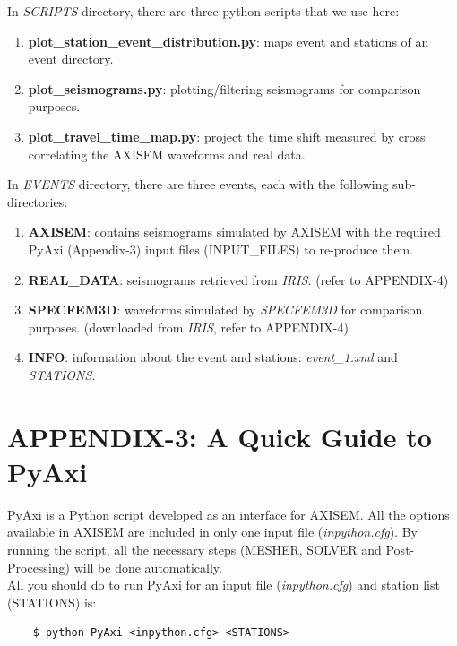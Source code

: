 \documentclass{article}
\begin{document}
In \textit{SCRIPTS} directory, there are three python scripts that we use here:

\begin{enumerate}
    \item \textbf{plot\_station\_event\_distribution.py}: maps event and stations of an
    event directory.
    \item \textbf{plot\_seismograms.py}: plotting/filtering seismograms for comparison purposes.
    \item \textbf{plot\_travel\_time\_map.py}: project the time shift measured by cross
    correlating the AXISEM waveforms and real data.
\end{enumerate}

In \textit{EVENTS} directory, there are three events, each with the following
sub-directories:

\begin{enumerate}
    \item \textbf{AXISEM}: contains seismograms simulated by AXISEM with
    the required PyAxi (Appendix-3) input files (INPUT\_FILES) to re-produce them.
    \item \textbf{REAL\_DATA}: seismograms retrieved from \textit{IRIS. }(refer to
    APPENDIX-4)
    \item \textbf{SPECFEM3D}: waveforms simulated by \textit{SPECFEM3D} for comparison purposes. (downloaded from\textit{ IRIS}, refer to APPENDIX-4)
    \item \textbf{INFO}: information about the event and stations: \textit{event\_1.xml} and
    \textit{STATIONS}.
\end{enumerate}


\newpage
\section{APPENDIX-3: A Quick Guide to PyAxi}

PyAxi is a Python script developed as an interface for AXISEM. All the options 
available in AXISEM are included in only one input file (\textit{inpython.cfg}). By running 
the script, all the necessary steps (MESHER, SOLVER and Post-Processing) will be 
done automatically. \\

All you should do to run PyAxi for an input file (\textit{inpython.cfg}) and station list 
(STATIONS) is:
\begin{verbatim}
    $ python PyAxi <inpython.cfg> <STATIONS>
\end{verbatim}
\end{document}
